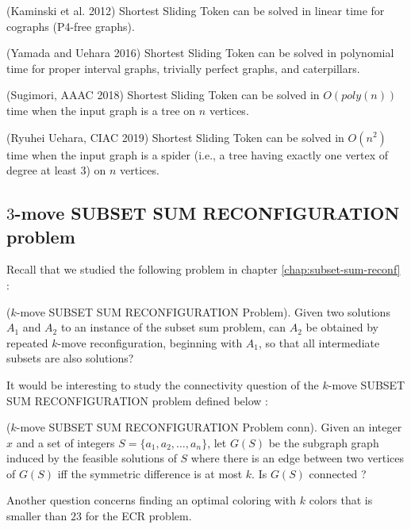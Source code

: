 \begin{theorem}(Kaminski et al. 2012)
Shortest Sliding Token can be solved in linear time for cographs (P4-free graphs).
\end{theorem}

\begin{theorem}(Yamada and Uehara 2016)
Shortest Sliding Token can be solved in polynomial time for proper interval graphs, trivially perfect graphs, and caterpillars.
\end{theorem}

\begin{theorem}(Sugimori, AAAC 2018)
Shortest Sliding Token can be solved in $O(poly(n))$ time when the input graph is a tree on $n$ vertices.
\end{theorem}

\begin{theorem}(Ryuhei Uehara, CIAC 2019)
Shortest Sliding Token can be solved in $O(n^2)$ time when the input graph is a spider (i.e., a tree having exactly one
vertex of degree at least $3$) on $n$ vertices.
\end{theorem}


\subsection{$3$-move SUBSET SUM RECONFIGURATION problem}
Recall that we studied the following problem in chapter \ref{chap:subset-sum-reconf} :
\begin{defn}{($k$-move SUBSET SUM RECONFIGURATION Problem).} Given two solutions $A_1$ and $A_2$ to an instance of the subset sum problem,
can $A_2$ be obtained by repeated $k$-move reconfiguration, beginning with $A_1$, so that all intermediate subsets are also solutions?
\end{defn}

It would be interesting to study the connectivity question of the $k$-move SUBSET SUM RECONFIGURATION problem defined below :
\begin{defn}{($k$-move SUBSET SUM RECONFIGURATION Problem conn).} Given an integer $x$ and a set of integers $S = \{a_1, a_2, \dots, a_n\}$,
let $G(S)$ be the subgraph graph induced by the feasible solutions of $S$ where there is an edge between two vertices
of $G(S)$ iff the symmetric difference is at most $k$. Is $G(S)$ connected ?
\end{defn}

Another question concerns finding an optimal coloring with $k$ colors that is smaller than $23$ for the ECR problem.
